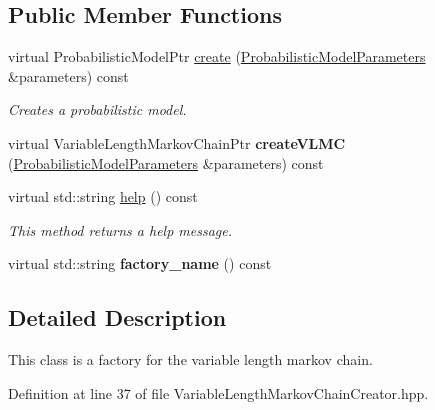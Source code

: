 \subsection*{Public Member Functions}
\begin{DoxyCompactItemize}
\item 
virtual Probabilistic\+Model\+Ptr \hyperlink{classtops_1_1VariableLengthMarkovChainCreator_a7b5275f19b97f4060274a7f8ec4f016b}{create} (\hyperlink{classtops_1_1ProbabilisticModelParameters}{Probabilistic\+Model\+Parameters} \&parameters) const
\begin{DoxyCompactList}\small\item\em Creates a probabilistic model. \end{DoxyCompactList}\item 
\mbox{\label{classtops_1_1VariableLengthMarkovChainCreator_acf02afd89f6d8d51478b13469cc97b7d}} 
virtual Variable\+Length\+Markov\+Chain\+Ptr {\bfseries create\+V\+L\+MC} (\hyperlink{classtops_1_1ProbabilisticModelParameters}{Probabilistic\+Model\+Parameters} \&parameters) const
\item 
\mbox{\label{classtops_1_1VariableLengthMarkovChainCreator_aaf10a74d2a592983790df5fd0a957724}} 
virtual std\+::string \hyperlink{classtops_1_1VariableLengthMarkovChainCreator_aaf10a74d2a592983790df5fd0a957724}{help} () const
\begin{DoxyCompactList}\small\item\em This method returns a help message. \end{DoxyCompactList}\item 
\mbox{\label{classtops_1_1VariableLengthMarkovChainCreator_ac1d49fc6a6e1370337947243c8d3cd2f}} 
virtual std\+::string {\bfseries factory\+\_\+name} () const
\end{DoxyCompactItemize}


\subsection{Detailed Description}
This class is a factory for the variable length markov chain. 

Definition at line 37 of file Variable\+Length\+Markov\+Chain\+Creator.\+hpp.




